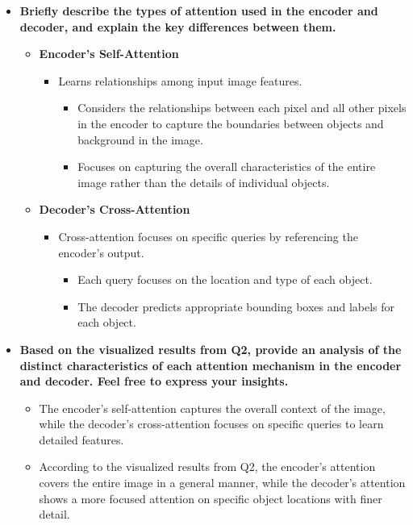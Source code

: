 \documentclass[11pt]{article}
\providecommand{\tightlist}{%
      \setlength{\itemsep}{0pt}\setlength{\parskip}{0pt}}
\begin{document}
\begin{itemize}
\item
  \textbf{Briefly describe the types of attention used in the encoder
  and decoder, and explain the key differences between them.}

  \begin{itemize}
  \tightlist
  \item
    \textbf{Encoder's Self-Attention}

    \begin{itemize}
    \tightlist
    \item
      Learns relationships among input image features.

      \begin{itemize}
      \tightlist
      \item
        Considers the relationships between each pixel and all other
        pixels in the encoder to capture the boundaries between objects
        and background in the image.
      \item
        Focuses on capturing the overall characteristics of the entire
        image rather than the details of individual objects.
      \end{itemize}
    \end{itemize}
  \item
    \textbf{Decoder's Cross-Attention}

    \begin{itemize}
    \tightlist
    \item
      Cross-attention focuses on specific queries by referencing the
      encoder's output.

      \begin{itemize}
      \tightlist
      \item
        Each query focuses on the location and type of each object.
      \item
        The decoder predicts appropriate bounding boxes and labels for
        each object.
      \end{itemize}
    \end{itemize}
  \end{itemize}
\item
  \textbf{Based on the visualized results from Q2, provide an analysis
  of the distinct characteristics of each attention mechanism in the
  encoder and decoder. Feel free to express your insights.}

  \begin{itemize}
  \tightlist
  \item
    The encoder's self-attention captures the overall context of the
    image, while the decoder's cross-attention focuses on specific
    queries to learn detailed features.
  \item
    According to the visualized results from Q2, the encoder's attention
    covers the entire image in a general manner, while the decoder's
    attention shows a more focused attention on specific object
    locations with finer detail.
  \end{itemize}
\end{itemize}


    
    
    
\end{document}
